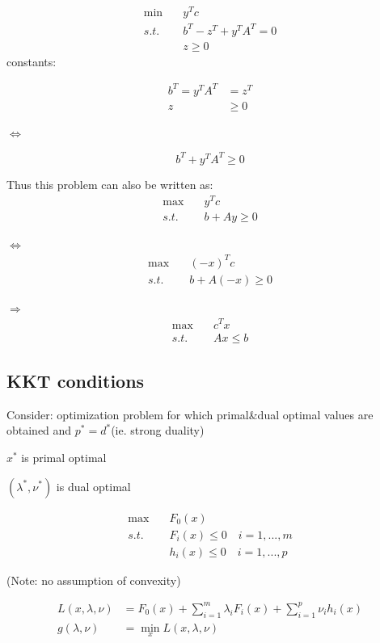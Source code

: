 \begin{align*}
\min\quad &y^Tc\\
s.t.\quad &b^T-z^T+y^TA^T=0\\
&z\geq 0
\end{align*}
constants:


\begin{align*}
b^T=y^TA^T &= z^T\\
z&\geq 0
\end{align*}

$\Leftrightarrow$

\begin{equation*}
b^T+y^TA^T \geq 0
\end{equation*}

Thus this problem can also be written as:
\begin{align*}
\max\quad &y^Tc\\
s.t.\quad &b+Ay \geq 0
\end{align*}

$\Leftrightarrow$
\begin{align*}
\max\quad &(-x)^Tc\\
s.t.\quad &b+A(-x) \geq 0
\end{align*}

$\Rightarrow$
\begin{align*}
\max\quad &c^Tx\\
s.t.\quad &Ax \leq b
\end{align*}


\subsection{KKT conditions}
Consider: optimization problem for which primal\&dual optimal values are obtained and $p^*=d^*$(ie. strong duality)

$x^*$ is primal optimal

$(\lambda^*,\nu^*)$ is dual optimal


\begin{align*}
\max\quad &F_0(x)\\
s.t.\quad &F_i(x)\leq 0\quad i = 1,...,m\\
&h_i(x)\leq 0\quad i = 1,...,p
\end{align*}

(Note: no assumption of convexity)


\begin{align*}
L(x,\lambda,\nu) &= F_0(x)+\sum^m_{i=1}\lambda_iF_i(x) + \sum^p_{i=1}\nu_ih_i(x)\\
g(\lambda,\nu)&= \min_xL(x,\lambda,\nu)
\end{align*}

